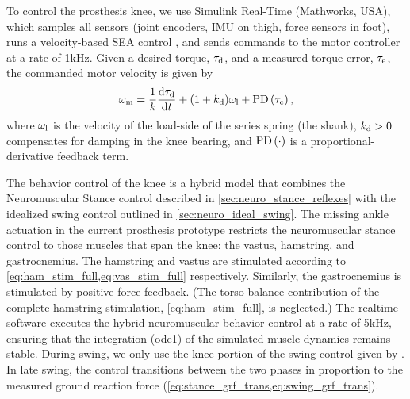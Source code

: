 To control the prosthesis knee, we use Simulink Real-Time (Mathworks, USA),
which samples all sensors (joint encoders, IMU on thigh, force sensors in foot),
runs a velocity-based SEA control \citep{schepelmann2012development}, and sends
commands to the motor controller at a rate of 1kHz. Given a desired torque,
$\tau_{\mathrm{d}}$, and a measured torque error, $\tau_{\mathrm{e}}$, the commanded motor
velocity is given by
\begin{align}
    \omega_\tn{m} = \frac{1}{k} \frac{\tn{d} \tau_\tn{d}}{\tn{d} t} 
        + (1 + k_\tn{d})\omega_\tn{l} + \func{PD}{\tau_\tn{e}},
    \label{eq:velocity_based_sea}
\end{align}
where $\omega_{\mathrm{l}}$ is the velocity of the load-side of the series spring (the
shank), $k_{\mathrm{d}}>0$ compensates for damping in the knee bearing, and
$\func{PD}{\cdot}$ is a proportional-derivative feedback term. 

The behavior control of the knee is a hybrid model that combines the
Neuromuscular Stance control described in \cref{sec:neuro_stance_reflexes} with
the idealized swing control outlined in \cref{sec:neuro_ideal_swing}. The
missing ankle actuation in the current prosthesis prototype restricts the
neuromuscular stance control to those muscles that span the knee: the vastus,
hamstring, and gastrocnemius. The hamstring and vastus are stimulated according
to \cref{eq:ham_stim_full,eq:vas_stim_full} respectively.  Similarly, the
gastrocnemius is stimulated by positive force feedback. (The torso balance
contribution of the complete hamstring stimulation, \cref{eq:ham_stim_full}, is
neglected.) The realtime software executes the hybrid neuromuscular behavior
control at a rate of 5kHz, ensuring that the integration (ode1) of the simulated
muscle dynamics remains stable. During swing, we only use the knee portion of
the swing control given by . In late swing,
the control transitions between the two phases in proportion to the measured
ground reaction force (\cref{eq:stance_grf_trans,eq:swing_grf_trans}).

